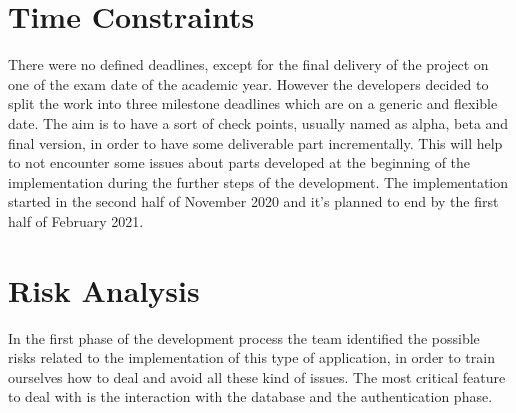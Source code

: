	\section{Time Constraints}
		There were no defined deadlines, except for the final delivery of the project on one of the exam date of the academic year.
		However the developers decided to split the work into three milestone deadlines which are on a generic and flexible date. 
		The aim is to have a sort of check points, usually named as alpha, beta and final version, in order to have some deliverable part incrementally.
		This will help to not encounter some issues about parts developed at the beginning of the implementation during the further steps of the development.
		The implementation started in the second half of November 2020 and it's planned to end by the first half of February 2021.


	\section{Risk Analysis}
		In the first phase of the development process the team identified the possible risks related to the implementation of this type of application, in order to train ourselves how to deal and avoid all these kind of issues.
		The most critical feature to deal with is the interaction with the database and the authentication phase.


